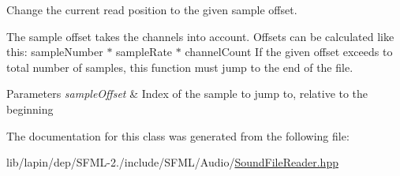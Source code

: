 Change the current read position to the given sample offset. 

The sample offset takes the channels into account. Offsets can be calculated like this\-: {\ttfamily sample\-Number $\ast$ sample\-Rate $\ast$ channel\-Count} If the given offset exceeds to total number of samples, this function must jump to the end of the file.


\begin{DoxyParams}{Parameters}
{\em sample\-Offset} & Index of the sample to jump to, relative to the beginning \\
\hline
\end{DoxyParams}


The documentation for this class was generated from the following file\-:\begin{DoxyCompactItemize}
\item 
lib/lapin/dep/\-S\-F\-M\-L-\/2./include/\-S\-F\-M\-L/\-Audio/\hyperlink{lapin_2dep_2_s_f_m_l-2_83_2include_2_s_f_m_l_2_audio_2_sound_file_reader_8hpp}{Sound\-File\-Reader.\-hpp}\end{DoxyCompactItemize}

